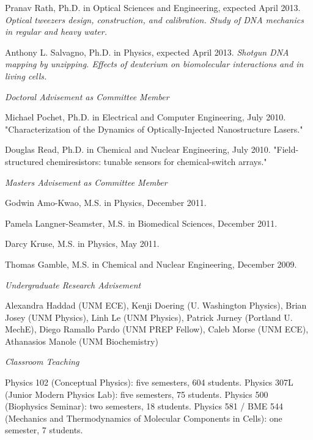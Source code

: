 \documentclass[11pt]{article}
\begin{document}
\ind Pranav Rath, Ph.D. in Optical Sciences and Engineering, expected April 2013.  \emph{Optical tweezers design, construction, and calibration. Study of DNA mechanics in regular and heavy water.}

\ind Anthony L. Salvagno, Ph.D. in Physics, expected April 2013. \emph{Shotgun DNA mapping by unzipping. Effects of deuterium on biomolecular interactions and in living cells.}       

\medskip
\noindent\emph{Doctoral Advisement as Committee Member \vspace{0.01in}}

\ind Michael Pochet, Ph.D. in Electrical and Computer Engineering, July 2010. "Characterization of the Dynamics of Optically-Injected Nanostructure Lasers."

\ind Douglas Read, Ph.D. in Chemical and Nuclear Engineering, July 2010. "Field-structured chemiresistors: tunable sensors for chemical-switch arrays."

\medskip

\noindent\emph{Masters Advisement as Committee Member \vspace{0.01in}}

\ind Godwin Amo-Kwao, M.S. in Physics, December 2011.

\ind Pamela Langner-Seamster, M.S. in Biomedical Sciences, December 2011.

\ind Darcy Kruse, M.S. in Physics, May 2011.

\ind Thomas Gamble, M.S. in Chemical and Nuclear Engineering, December 2009.

\medskip

\noindent\emph{Undergraduate Research Advisement \vspace{0.01in}}

\ind Alexandra Haddad (UNM ECE), Kenji Doering (U. Washington Physics), Brian Josey (UNM Physics), Linh Le (UNM Physics), Patrick Jurney (Portland U. MechE), Diego Ramallo Pardo (UNM PREP Fellow), Caleb Morse (UNM ECE), Athanasios Manole (UNM Biochemistry)

\medskip

\noindent\emph{Classroom Teaching \vspace{0.01in}}

\ind Physics 102 (Conceptual Physics): five semesters, 604 students. Physics 307L (Junior Modern Physics Lab): five semesters, 75 students. Physics 500 (Biophysics Seminar): two semesters, 18 students. Physics 581 / BME 544 (Mechanics and Thermodynamics of Molecular Components in Cells): one semester, 7 students.
\end{document}
